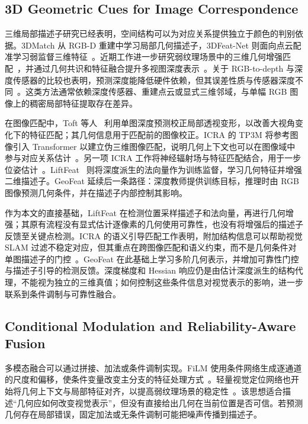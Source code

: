 \documentclass{article}
\begin{document}
\subsection{3D Geometric Cues for Image Correspondence}
三维局部描述子研究已经表明，空间结构可以为对应关系提供独立于颜色的判别依据。3DMatch 从 RGB-D 重建中学习局部几何描述子，3DFeat-Net 则面向点云配准学习弱监督三维特征~\cite{Zeng2017_3DMatch,Yew2018_3DFeatNet}。近期工作进一步研究弱纹理场景中的三维几何增强匹配~\cite{Sun2026GeomEff}，并通过几何共识和特征融合提升多视图深度表示~\cite{Zhu2026GeoFusion}。关于 RGB-to-depth 与深度传感器的比较也表明，预测深度能降低硬件依赖，但其误差性质与传感器深度不同~\cite{Ren2026DepthCamera}。这类方法通常依赖深度传感器、重建点云或显式三维邻域，与单幅 RGB 图像上的稠密局部特征提取存在差异。

在图像匹配中，Toft 等人~\cite{Toft2020DepthMatching} 利用单图深度预测校正局部透视变形，以改善大视角变化下的特征匹配；其几何信息用于匹配前的图像校正。ICRA 的 TP3M 将参考图像引入 Transformer 以建立伪三维图像匹配，说明几何上下文也可以在图像域中参与对应关系估计~\cite{Han2024TP3M}。另一项 ICRA 工作将神经辐射场与特征匹配结合，用于一步位姿估计~\cite{Chen2024NeRFMatching}。LiftFeat~\cite{LiftFeat} 则将深度派生的法向量作为训练监督，学习几何特征并增强二维描述子。GeoFeat 延续后一条路径：深度教师提供训练目标，推理时由 RGB 图像预测几何条件，并在描述子内部控制其影响。

作为本文的直接基础，LiftFeat 在检测位置采样描述子和法向量，再进行几何增强；其原有流程没有显式估计逐像素的几何使用可靠性，也没有将增强后的描述子反馈至关键点检测。ICRA 的语义引导匹配工作表明，附加结构信息可以帮助视觉 SLAM 过滤不稳定对应，但其重点在跨图像匹配和语义约束，而不是几何条件对单图描述子的门控~\cite{Ilter2024SemanticMatching}。GeoFeat 在此基础上学习多阶几何表示，并增加可靠性门控与描述子引导的检测反馈。深度梯度和 Hessian 响应仍是由估计深度派生的结构代理，不能视为独立的三维真值；如何控制这些条件信息对视觉表示的影响，进一步联系到条件调制与可靠性融合。

\subsection{Conditional Modulation and Reliability-Aware Fusion}
多模态融合可以通过拼接、加法或条件调制实现。FiLM 使用条件网络生成逐通道的尺度和偏移，使条件变量改变主分支的特征处理方式~\cite{Perez2018FiLM}。轻量视觉定位网络也开始将几何上下文与局部特征对齐，以提高弱纹理场景的稳定性~\cite{Deng2026GCANet}。该思想适合描述“几何应如何改变视觉表示”，但没有直接给出几何在当前位置是否可信。若预测几何存在局部错误，固定加法或无条件调制可能把噪声传播到描述子。
\end{document}
